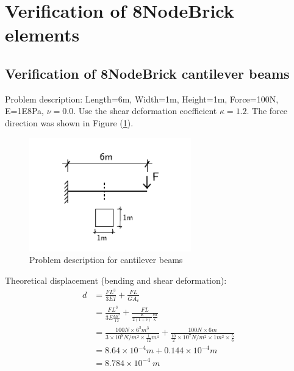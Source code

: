 \documentclass[fleqn,11pt]{article}
\begin{document}
\newpage



\section{Verification of 8NodeBrick elements}
\vskip 24pt

\subsection{Verification of 8NodeBrick cantilever beams}




Problem description: Length=6m, Width=1m, Height=1m, Force=100N, E=1E8Pa, $\nu=0.0$. Use the shear deformation coefficient $\kappa=1.2$. The force direction was shown in Figure (\ref{fig Problem description for cantilever beams}). 

\begin{figure}[H]
  \centering
  \includegraphics[width=7cm]{../Figure-files/cantilever_6.pdf}
  \caption{Problem description for cantilever beams}
  \label{fig Problem description for cantilever beams}
\end{figure}


Theoretical displacement (bending and shear deformation):
\begin{equation}
  \begin{aligned}
  d &=\frac{FL^3}{3EI}+\frac{FL}{GA_v} \\
  &= \frac{FL^3}{3E\frac{bh^3}{12}}+\frac{FL}{\frac{E}{2(1+\nu)} \frac{bh}{\kappa}} \\ 
    &= \frac{100 N \times 6^3 m^3}{3\times 10^8 N/m^2 \times \frac{1}{12} m^4}+ 
    \frac{100 N\times 6 m}{\frac{10}{2} \times 10^7 N/m^2\times 1 m^2 \times \frac{5}{6}} \\ 
    &=8.64\times 10^{-4} m + 0.144 \times 10^{-4} m   \\
   & =8.784\times 10^{-4} \ m
   \end{aligned}
\end{equation}
\end{document}
